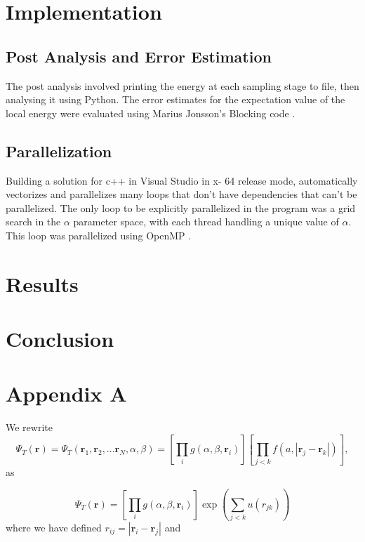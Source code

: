 \documentclass[11pt,a4paper,titlepage]{article}
\begin{document}
\section{Implementation}

\subsection{Post Analysis and Error Estimation}
The post analysis involved printing the energy at each sampling stage to file, then analysing it using Python. The error estimates for the expectation value of the local energy were evaluated using Marius Jonsson's Blocking code \cite{PhysRevE.98.043304}.
\subsection{Parallelization}
Building a solution for c++ in Visual Studio in x- 64 release mode, automatically vectorizes and parallelizes many loops that don't have dependencies that can't be parallelized. The only loop to be explicitly parallelized in the program was a grid search in the $\alpha$ parameter space, with each thread handling a unique value of $\alpha$. This loop was parallelized using OpenMP \cite{openmp08}.
\section{Results}



\section{Conclusion}


\section{Appendix A}\label{app_A}
We rewrite 
\begin{equation*}
\Psi_T(\mathbf{r})=\Psi_T(\mathbf{r}_1, \mathbf{r}_2, \dots \mathbf{r}_N,\alpha,\beta)
=\left[
    \prod_i g(\alpha,\beta,\mathbf{r}_i)
\right]
\left[
    \prod_{j<k}f(a,|\mathbf{r}_j-\mathbf{r}_k|)
\right],
\end{equation*}
as

\begin{equation*}
\Psi_T(\mathbf{r})=\left[
    \prod_i g(\alpha,\beta,\mathbf{r}_i)
\right]
\exp{\left(\sum_{j<k}u(r_{jk})\right)}
\end{equation*}
where we have defined $r_{ij}=|\mathbf{r}_i-\mathbf{r}_j|$
and
\end{document}
